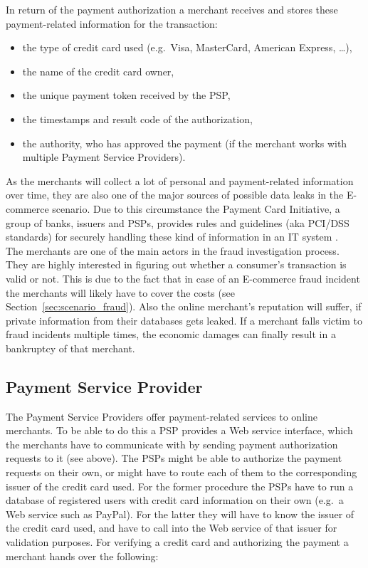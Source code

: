 In return of the payment authorization a merchant receives and stores these  payment-related information for the transaction:\@

\begin{itemize}
		\item the type of credit card used (e.g.\ Visa, MasterCard, American Express, \ldots),
		\item the name of the credit card owner,
		\item the unique payment token received by the \gls{PSP},
		\item the timestamps and result code of the authorization,
		\item the authority, who has approved the payment (if the merchant works with multiple Payment Service Providers).
\end{itemize}

As the merchants will collect a lot of personal and payment-related information over time, they are also one of the major sources of possible data leaks in the \gls{E-commerce} scenario. Due to this circumstance the Payment Card Initiative, a group of banks, issuers and \gls{PSP}s, provides rules and guidelines (aka \gls{PCI/DSS} standards) for securely handling these kind of information in an \gls{IT} system \citep{virtue2009payment}. \\

The merchants are one of the main actors in the fraud investigation process. They are highly interested in figuring out whether a consumer's transaction is valid or not. This is due to the fact that in case of an \gls{E-commerce} fraud incident the merchants will likely have to cover the costs (see Section~\ref{sec:scenario_fraud}). Also the online merchant's reputation will suffer, if private information from their databases gets leaked. If a merchant falls victim to fraud incidents multiple times, the economic damages can finally result in a bankruptcy of that merchant.


\subsection{Payment Service Provider}
\label{subsec:stakeholder_psp}

The Payment Service Providers offer payment-related services to online merchants. To be able to do this a \gls{PSP} provides a Web service interface, which the merchants have to communicate with by sending payment authorization requests to it (see above). The \gls{PSP}s might be able to authorize the payment requests on their own, or might have to route each of them to the corresponding issuer of the credit card used. For the former procedure the \gls{PSP}s have to run a database of registered users with credit card information on their own (e.g.\ a Web service such as PayPal). For the latter they will have to know the issuer of the credit card used, and have to call into the Web service of that issuer for validation purposes. For verifying a credit card and authorizing the payment a merchant hands over the following:\@

